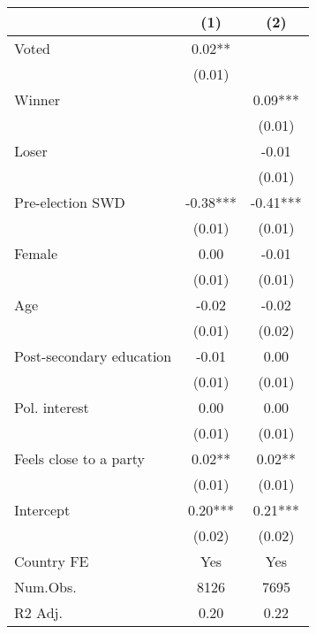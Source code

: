 \begin{tabular}[t]{lcc}
\toprule
  & (1) & (2)\\
\midrule
Voted & 0.02** & \\
 & (0.01) & \\
Winner &  & 0.09***\\
 &  & \vphantom{1} (0.01)\\
Loser &  & -0.01\\
 &  & (0.01)\\
Pre-election SWD & -0.38*** & -0.41***\\
 & (0.01) & \vphantom{4} (0.01)\\
Female & 0.00 & -0.01\\
 & (0.01) & \vphantom{3} (0.01)\\
Age & -0.02 & -0.02\\
 & (0.01) & (0.02)\\
Post-secondary education & -0.01 & 0.00\\
 & (0.01) & \vphantom{2} (0.01)\\
Pol. interest & 0.00 & 0.00\\
 & (0.01) & \vphantom{1} (0.01)\\
Feels close to a party & 0.02** & 0.02**\\
 & (0.01) & (0.01)\\
Intercept & 0.20*** & 0.21***\\
 & (0.02) & (0.02)\\
\midrule
Country FE & Yes & Yes \\
Num.Obs. & 8126 & 7695 \\
R2 Adj. & 0.20 & 0.22 \\
\bottomrule
\end{tabular}
